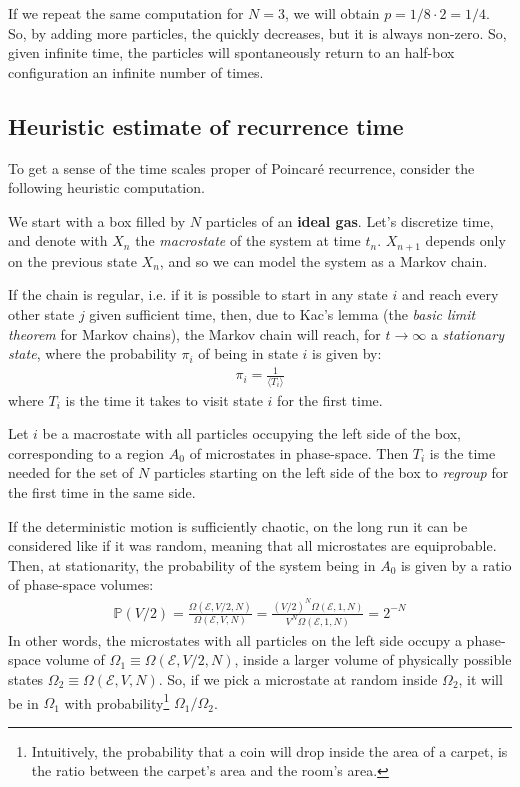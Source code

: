 \documentclass[../../main.tex]{subfiles}
\begin{document}
\medskip

If we repeat the same computation for $N=3$, we will obtain $p=1/8 \cdot 2 = 1/4$. So, by adding more particles, the  quickly decreases, but it is always non-zero. So, given infinite time, the particles will spontaneously return to an half-box configuration an infinite number of times.

\subsection{Heuristic estimate of recurrence time}
To get a sense of the time scales proper of Poincaré recurrence, consider the following heuristic computation.

\medskip

We start with a box filled by $N$ particles of an \textbf{ideal gas}. Let's discretize time, and denote with $X_n$ the \textit{macrostate} of the system at time $t_n$. $X_{n+1}$ depends only on the previous state $X_n$, and so we can model the system as a Markov chain. %

If the chain is regular, i.e. if it is possible to start in any state $i$ and reach every other state $j$ given sufficient time, then, due to Kac's lemma (the \textit{basic limit theorem} for Markov chains), the Markov chain will reach, for $t \to \infty$ a \textit{stationary state}, where the probability $\pi_i$ of being in state $i$ is given by:
\begin{align}\label{eqn:kaclemma}
    \pi_i = \frac{1}{\langle T_i \rangle} 
\end{align}
where $T_i$ is the time it takes to visit state $i$ for the first time. 

\medskip

Let $i$ be a macrostate with all particles occupying the left side of the box, corresponding to a region $A_0$ of microstates in phase-space. Then $T_i$ is the time needed for the set of $N$ particles starting on the left side of the box to \textit{regroup} for the first time in the same side.

\medskip

If the deterministic motion is sufficiently chaotic, on the long run it can be considered like if it was random, meaning that all microstates are equiprobable. Then, at stationarity, the probability of the system being in $A_0$ is given by a ratio of phase-space volumes:
\begin{align}\label{eqn:pvmezzo}
    \mathbb{P}(V/2) = \frac{\Omega(\mathcal{E}, V/2, N)}{\Omega(\mathcal{E}, V, N)} = \frac{(V/2)^N \Omega(\mathcal{E},1, N)}{V^N \Omega (\mathcal{E},1,N)} = 2^{-N}
\end{align}
In other words, the microstates with all particles on the left side occupy a phase-space volume of $\Omega_1 \equiv \Omega(\mathcal{E}, V/2, N)$, inside a larger volume of physically possible states $\Omega_2 \equiv \Omega(\mathcal{E}, V, N)$. So, if we pick a microstate at random inside $\Omega_2$, it will be in $\Omega_1$ with probability\footnote{Intuitively, the probability that a coin will drop inside the area of a carpet, is the ratio between the carpet's area and the room's area.} $\Omega_1/\Omega_2$. 
\end{document}
